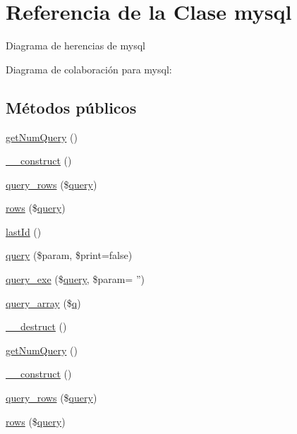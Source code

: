 \hypertarget{classmysql}{\section{Referencia de la Clase mysql}
\label{classmysql}
}


Diagrama de herencias de mysql


Diagrama de colaboración para mysql\-:
\subsection*{Métodos públicos}
\begin{DoxyCompactItemize}
\item 
\hyperlink{classmysql_ad5420dbc0c9f855b6965dd0c08f213dc}{get\-Num\-Query} ()
\item 
\hyperlink{classmysql_a095c5d389db211932136b53f25f39685}{\-\_\-\-\_\-construct} ()
\item 
\hyperlink{classmysql_a1c50ed902c43f3060cefae287fe9bc42}{query\-\_\-rows} (\$\hyperlink{classmysql_a894b10e0655909f999d9f08e293a789a}{query})
\item 
\hyperlink{classmysql_ae94c38578a427fe7ded34c092005265f}{rows} (\$\hyperlink{classmysql_a894b10e0655909f999d9f08e293a789a}{query})
\item 
\hyperlink{classmysql_a27993b901efcccbdbb2738ffdec18f16}{last\-Id} ()
\item 
\hyperlink{classmysql_a894b10e0655909f999d9f08e293a789a}{query} (\$param, \$print=false)
\item 
\hyperlink{classmysql_a3f03bc98b3a3ca0dc3a946f626ba04bc}{query\-\_\-exe} (\$\hyperlink{classmysql_a894b10e0655909f999d9f08e293a789a}{query}, \$param= '')
\item 
\hyperlink{classmysql_af3238cdb7634f797cd87dcc85301ae1a}{query\-\_\-array} (\$\hyperlink{classdao_a57b42422089be85e61d4482406f050eb}{q})
\item 
\hyperlink{classmysql_a421831a265621325e1fdd19aace0c758}{\-\_\-\-\_\-destruct} ()
\item 
\hyperlink{classmysql_ad5420dbc0c9f855b6965dd0c08f213dc}{get\-Num\-Query} ()
\item 
\hyperlink{classmysql_a095c5d389db211932136b53f25f39685}{\-\_\-\-\_\-construct} ()
\item 
\hyperlink{classmysql_a1c50ed902c43f3060cefae287fe9bc42}{query\-\_\-rows} (\$\hyperlink{classmysql_a894b10e0655909f999d9f08e293a789a}{query})
\item 
\hyperlink{classmysql_ae94c38578a427fe7ded34c092005265f}{rows} (\$\hyperlink{classmysql_a894b10e0655909f999d9f08e293a789a}{query})

\end{DoxyCompactItemize}

